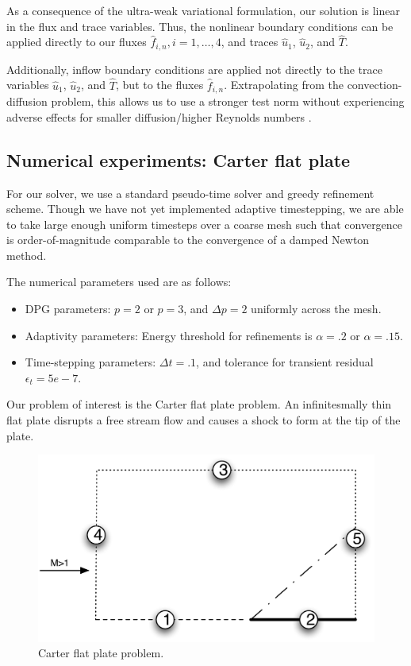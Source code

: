 As a consequence of the ultra-weak variational formulation, our solution is linear in the flux and trace variables. Thus, the nonlinear boundary conditions can be applied directly to our fluxes $\widehat{f}_{i,n}, i = 1,\ldots,4$, and traces $\widehat{u}_1$, $\widehat{u}_2$, and $\widehat{T}$. 

Additionally, inflow boundary conditions are applied not directly to the trace variables $\widehat{u}_1$, $\widehat{u}_2$, and $\widehat{T}$, but to the fluxes $\widehat{f}_{i,n}$. Extrapolating from the convection-diffusion problem, this allows us to use a stronger test norm without experiencing adverse effects for smaller diffusion/higher Reynolds numbers \cite{DPGrobustness,DPGrobustness2}.

\subsection{Numerical experiments: Carter flat plate}

For our solver, we use a standard pseudo-time solver and greedy refinement scheme. Though we have not yet implemented adaptive timestepping, we are able to take large enough uniform timesteps over a coarse mesh such that convergence is order-of-magnitude comparable to the convergence of a damped Newton method. 

The numerical parameters used are as follows:
\begin{itemize}
\item{DPG parameters:} $p = 2$ or $p=3$, and $\Delta p = 2$ uniformly across the mesh. 
\item{Adaptivity parameters:} Energy threshold for refinements is $\alpha = .2$ or $\alpha = .15$. 
\item{Time-stepping parameters:} $\Delta t = .1$, and tolerance for transient residual $\epsilon_t = 5e-7$.
\end{itemize}

Our problem of interest is the Carter flat plate problem. An infinitesmally thin flat plate disrupts a free stream flow and causes a shock to form at the tip of the plate. 

\begin{figure}[!h]
\centering
\includegraphics[scale=.5]{figs/flat_plate_BCs.pdf}
\caption{Carter flat plate problem.}
\end{figure}

